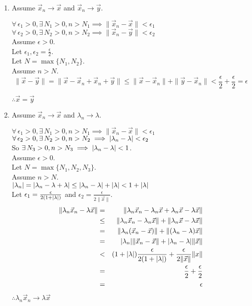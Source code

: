 \documentclass[letterpaper,12pt,fleqn]{article}
\newcommand{\e}{\epsilon}
\renewcommand{\l}{\lambda}
\newcommand{\norm}[1]{\|#1\|}
\newcommand{\vx}{\vec{x}}
\newcommand{\vy}{\vec{y}}
\begin{document}
\begin{theproof}
  \listbreak
  \begin{enumerate}
  \item Assume $\vx_n\to\vx$ and $\vx_n\to\vy$.

    $\forall\,\e_1>0,\exists\,N_1>0,n>N_1\implies\norm{\vx_n-\vx}<\e_1$ \\
    $\forall\,\e_2>0,\exists\,N_2>0,n>N_2\implies\norm{\vx_n-\vy}<\e_2$ \\
    Assume $\e>0$. \\
    Let $\e_1,\e_2=\frac{\e}{2}$. \\
    Let $N=\max\{N_1,N_2\}$. \\
    Assume $n>N$. \\
    \[\norm{\vx-\vy}=\norm{\vx-\vx_n+\vx_n+\vy}\le
    \norm{\vx-\vx_n}+\norm{\vy-\vx_n}<\frac{\e}{2}+\frac{\e}{2}=\e\]

    $\therefore\vx=\vy$

  \item Assume $\vx_n\to\vx$ and $\l_n\to\l$.

    $\forall\,\e_1>0,\exists\,N_1>0,n>N_1\implies\norm{\vx_n-\vx}<\e_1$ \\
    $\forall\,\e_2>0,\exists\,N_2>0,n>N_2\implies\abs{\l_n-\l}<\e_2$ \\
    So $\exists\,N_3>0,n>N_3\implies\abs{\l_n-\l}<1$. \\
    Assume $\e>0$. \\
    Let $N=\max\{N_1,N_2,N_3\}$. \\
    Assume $n>N$. \\
    $\abs{\l_n}=\abs{\l_n-\l+\l}\le\abs{\l_n-\l}+\abs{\l}<1+\abs{\l}$ \\
    Let $\e_1=\frac{\e}{2(1+\abs{\l})}$ and
    $\e_2=\frac{\e}{2\norm{\vx}}$.
    \begin{eqnarray*}
      \norm{\l_n\vx_n-\l\vx} &=& \norm{\l_n\vx_n-\l_n\vx+\l_n\vx-\l\vx} \\
      &\le& \norm{\l_n\vx_n-\l_n\vx}+\norm{\l_n\vx-\l\vx} \\
      &=& \norm{\l_n(\vx_n-\vx)}+\norm{(\l_n-\l)\vx} \\
      &=& \abs{\l_n}\norm{\vx_n-\vx}+\abs{\l_n-\l}\norm{\vx} \\
      &<& (1+\abs{\l})\frac{\e}{2(1+\abs{\l})}+\frac{\e}{2\norm{\vx}}\norm{x} \\
      &=& \frac{\e}{2}+\frac{\e}{2} \\
      &=& \e
    \end{eqnarray*}
    $\therefore\l_n\vx_n\to\l\vx$


\end{enumerate}
\end{theproof}
\end{document}
